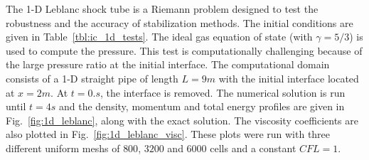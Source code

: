 \documentclass[preprint,10pt]{elsarticle}
\newcommand{\fig}[1]{Fig.~\ref{#1}}                      %
\newcommand{\tbl}[1]{Table~\ref{#1}}                     %
\begin{document}
The 1-D Leblanc shock tube is a Riemann problem designed to test the robustness and the accuracy of stabilization methods. The initial conditions are given in \tbl{tbl:ic_1d_tests}. The ideal gas equation of state (with $\gamma=5/3$) is used to compute the pressure.
This test is computationally challenging because of the large pressure ratio at the initial interface.
The computational domain consists of a 1-D straight pipe of length $L=9m$ with the initial interface located at $x=2m$. At $t=0.s$, the interface is removed. The numerical solution is run until $t=4 s$ and the density, momentum and total energy profiles are given in \fig{fig:1d_leblanc}, along with the exact solution. The viscosity coefficients are also plotted in \fig{fig:1d_leblanc_visc}. These plots were  run with three different uniform meshs of $800$, $3200$ and $6000$ cells and a constant $CFL = 1$.
\end{document}
